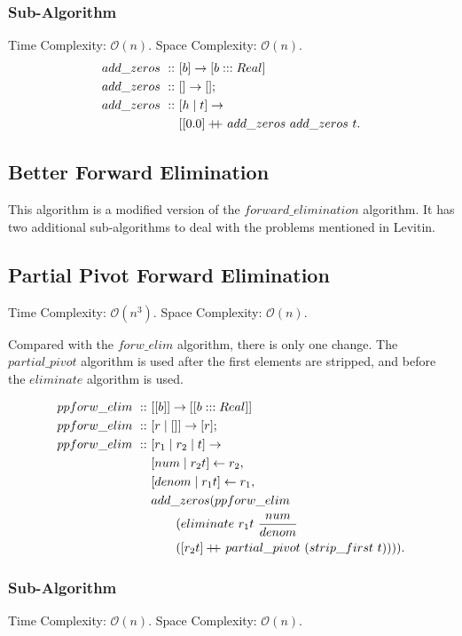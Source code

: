 \documentclass[a4paper,10pt]{book}
\newcommand\doubleplus{+\kern-1.3ex+\kern0.8ex}
\begin{document}
\subsubsection{Sub-Algorithm}Time Complexity: $\mathcal{O}(n)$. Space Complexity: $\mathcal{O}(n)$.
\begin{align*}
add\_zeros\ ::\ &[b]\rightarrow [b:::Real]\\
add\_zeros\ ::\ &[]\rightarrow [];\\
add\_zeros\ ::\ &[h\mid t]\rightarrow\\
	&[[0.0]\doubleplus add\_zeros\ add\_zeros\ t.
\end{align*}

\subsection{Better Forward Elimination}
This algorithm is a modified version of the $forward\_elimination$ algorithm. It has two additional sub-algorithms to deal with the problems mentioned in Levitin.
\subsection{Partial Pivot Forward Elimination}Time Complexity: $\mathcal{O}(n^3)$. Space Complexity: $\mathcal{O}(n)$.

Compared with the $forw\_elim$ algorithm, there is only one change. The $partial\_pivot$ algorithm is used after the first elements are stripped, and before the $eliminate$ algorithm is used.


\begin{align*}
ppforw\_elim\ ::\ &[[b]]\rightarrow [[b:::Real]]\\
ppforw\_elim\ ::\ &[r\mid []]\rightarrow [r];\\
ppforw\_elim\ ::\ &[r_1\mid r_2\mid t]\rightarrow\\
	&[num\mid r_2t]\leftarrow r_2,\\
	&[denom\mid r_1t]\leftarrow r_1,\\
	&add\_zeros (ppforw\_elim \\
	&\qquad (eliminate\ r_1t\ \frac{num}{denom}\\
	&\qquad ([r_2t]\doubleplus partial\_pivot\ (strip\_first\ t)))).
\end{align*}
\subsubsection{Sub-Algorithm}Time Complexity: $\mathcal{O}(n)$. Space Complexity: $\mathcal{O}(n)$.
\end{document}
